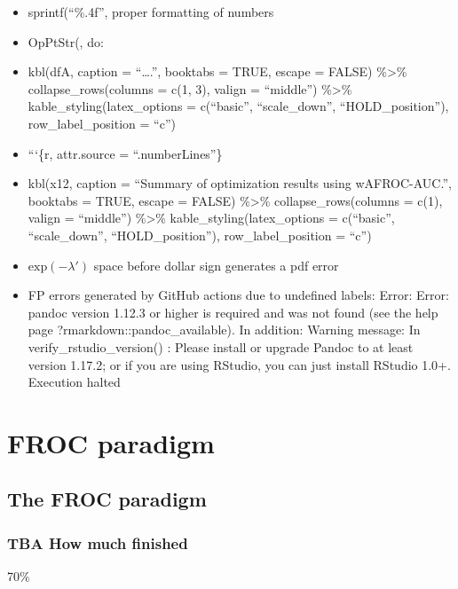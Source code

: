 \documentclass[
]{book}
\providecommand{\tightlist}{%
  \setlength{\itemsep}{0pt}\setlength{\parskip}{0pt}}
\begin{document}
\begin{itemize}
\tightlist
\item
  sprintf(``\%.4f'', proper formatting of numbers
\item
  OpPtStr(, do:
\item
  kbl(dfA, caption = ``\ldots.'', booktabs = TRUE, escape = FALSE) \%\textgreater\% collapse\_rows(columns = c(1, 3), valign = ``middle'') \%\textgreater\% kable\_styling(latex\_options = c(``basic'', ``scale\_down'', ``HOLD\_position''), row\_label\_position = ``c'')
\item
  ```\{r, attr.source = ``.numberLines''\}
\item
  kbl(x12, caption = ``Summary of optimization results using wAFROC-AUC.'', booktabs = TRUE, escape = FALSE) \%\textgreater\% collapse\_rows(columns = c(1), valign = ``middle'') \%\textgreater\% kable\_styling(latex\_options = c(``basic'', ``scale\_down'', ``HOLD\_position''), row\_label\_position = ``c'')
\item
  \(\text{exp} \left ( -\lambda' \right )\) space before dollar sign generates a pdf error
\item
  FP errors generated by GitHub actions due to undefined labels:
  Error: Error: pandoc version 1.12.3 or higher is required and was not found (see the help page ?rmarkdown::pandoc\_available).
  In addition: Warning message:
  In verify\_rstudio\_version() :
  Please install or upgrade Pandoc to at least version 1.17.2; or if you are using RStudio, you can just install RStudio 1.0+.
  Execution halted
\end{itemize}

\hypertarget{part-froc-paradigm}{%
\part*{FROC paradigm}\label{part-froc-paradigm}}

\hypertarget{froc-paradigm}{%
\chapter{The FROC paradigm}\label{froc-paradigm}}

\hypertarget{froc-paradigm-how-much-finished}{%
\section{TBA How much finished}\label{froc-paradigm-how-much-finished}}

70\%
\end{document}
